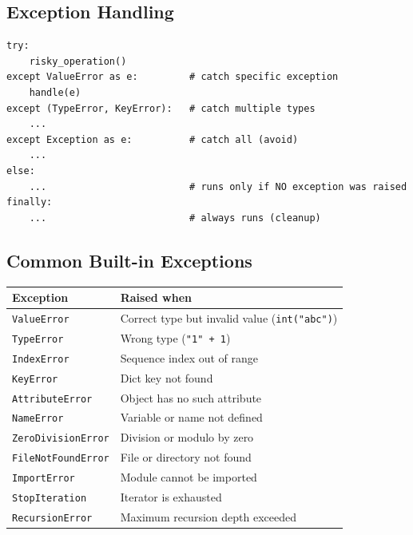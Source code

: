 \documentclass[oneside]{book}
\begin{document}

\subsection*{Exception Handling}

\begin{codebox}
\begin{lstlisting}
try:
    risky_operation()
except ValueError as e:         # catch specific exception
    handle(e)
except (TypeError, KeyError):   # catch multiple types
    ...
except Exception as e:          # catch all (avoid)
    ...
else:
    ...                         # runs only if NO exception was raised
finally:
    ...                         # always runs (cleanup)
\end{lstlisting}
\end{codebox}

\subsection*{Common Built-in Exceptions}

\begin{center}
\begin{tabularx}{\linewidth}{lX}
\toprule
\textbf{Exception} & \textbf{Raised when} \\
\midrule
\texttt{ValueError}         & Correct type but invalid value (\texttt{int("abc")}) \\
\texttt{TypeError}          & Wrong type (\texttt{"1" + 1}) \\
\texttt{IndexError}         & Sequence index out of range \\
\texttt{KeyError}           & Dict key not found \\
\texttt{AttributeError}     & Object has no such attribute \\
\texttt{NameError}          & Variable or name not defined \\
\texttt{ZeroDivisionError}  & Division or modulo by zero \\
\texttt{FileNotFoundError}  & File or directory not found \\
\texttt{ImportError}        & Module cannot be imported \\
\texttt{StopIteration}      & Iterator is exhausted \\
\texttt{RecursionError}     & Maximum recursion depth exceeded \\
\bottomrule
\end{tabularx}
\end{center}
\end{document}
